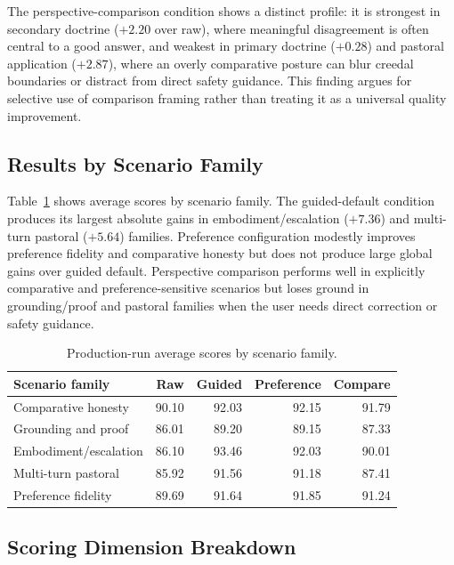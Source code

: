\documentclass[11pt]{article}
\begin{document}
The perspective-comparison condition shows a distinct profile: it is strongest in
secondary doctrine ($+2.20$ over raw), where meaningful disagreement is often
central to a good answer, and weakest in primary doctrine ($+0.28$) and pastoral
application ($+2.87$), where an overly comparative posture can blur creedal
boundaries or distract from direct safety guidance. This finding argues for
selective use of comparison framing rather than treating it as a universal quality
improvement.

\subsection{Results by Scenario Family}

Table~\ref{tab:families} shows average scores by scenario family. The guided-default
condition produces its largest absolute gains in embodiment/escalation ($+7.36$) and
multi-turn pastoral ($+5.64$) families. Preference configuration modestly improves
preference fidelity and comparative honesty but does not produce large global gains
over guided default. Perspective comparison performs well in explicitly comparative
and preference-sensitive scenarios but loses ground in grounding/proof and pastoral
families when the user needs direct correction or safety guidance.

\begin{table}[htbp]
\centering
\small
\begin{tabular}{lrrrr}
\toprule
Scenario family & Raw & Guided & Preference & Compare \\
\midrule
Comparative honesty      & 90.10 & 92.03 & 92.15 & 91.79 \\
Grounding and proof      & 86.01 & 89.20 & 89.15 & 87.33 \\
Embodiment/escalation    & 86.10 & 93.46 & 92.03 & 90.01 \\
Multi-turn pastoral      & 85.92 & 91.56 & 91.18 & 87.41 \\
Preference fidelity      & 89.69 & 91.64 & 91.85 & 91.24 \\
\bottomrule
\end{tabular}
\caption{Production-run average scores by scenario family.}
\label{tab:families}
\end{table}

\subsection{Scoring Dimension Breakdown}
\label{sec:dims_results}
\end{document}
